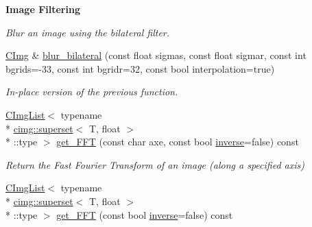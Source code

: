 \begin{Indent}{\bf Image Filtering}
\begin{DoxyCompactItemize}
\begin{DoxyCompactList}\small\item\em Blur an image using the bilateral filter. \end{DoxyCompactList}\item 
\hypertarget{structcimg__library_1_1_c_img_a1d6c1738e6d9db418b150cc2aedca0a5}{\hyperlink{structcimg__library_1_1_c_img}{C\-Img} \& \hyperlink{structcimg__library_1_1_c_img_a1d6c1738e6d9db418b150cc2aedca0a5}{blur\-\_\-bilateral} (const float sigmas, const float sigmar, const int bgrids=-\/33, const int bgridr=32, const bool interpolation=true)}\label{structcimg__library_1_1_c_img_a1d6c1738e6d9db418b150cc2aedca0a5}

\begin{DoxyCompactList}\small\item\em In-\/place version of the previous function. \end{DoxyCompactList}\item 
\hypertarget{structcimg__library_1_1_c_img_ace7d2d2ed67db4b114b0d3ed5d546197}{\hyperlink{structcimg__library_1_1_c_img_list}{C\-Img\-List}$<$ typename \\*
\hyperlink{structcimg__library_1_1cimg_1_1superset}{cimg\-::superset}$<$ T, float $>$\\*
\-::type $>$ \hyperlink{structcimg__library_1_1_c_img_ace7d2d2ed67db4b114b0d3ed5d546197}{get\-\_\-\-F\-F\-T} (const char axe, const bool \hyperlink{structcimg__library_1_1_c_img_abaeeed53c26e52bb8f518242df202267}{inverse}=false) const }\label{structcimg__library_1_1_c_img_ace7d2d2ed67db4b114b0d3ed5d546197}

\begin{DoxyCompactList}\small\item\em Return the Fast Fourier Transform of an image (along a specified axis) \end{DoxyCompactList}\item 
\hypertarget{structcimg__library_1_1_c_img_aa56f513dfc288f707edd78a812d88c64}{\hyperlink{structcimg__library_1_1_c_img_list}{C\-Img\-List}$<$ typename \\*
\hyperlink{structcimg__library_1_1cimg_1_1superset}{cimg\-::superset}$<$ T, float $>$\\*
\-::type $>$ \hyperlink{structcimg__library_1_1_c_img_aa56f513dfc288f707edd78a812d88c64}{get\-\_\-\-F\-F\-T} (const bool \hyperlink{structcimg__library_1_1_c_img_abaeeed53c26e52bb8f518242df202267}{inverse}=false) const }\label{structcimg__library_1_1_c_img_aa56f513dfc288f707edd78a812d88c64}


\end{DoxyCompactItemize}
\end{Indent}
